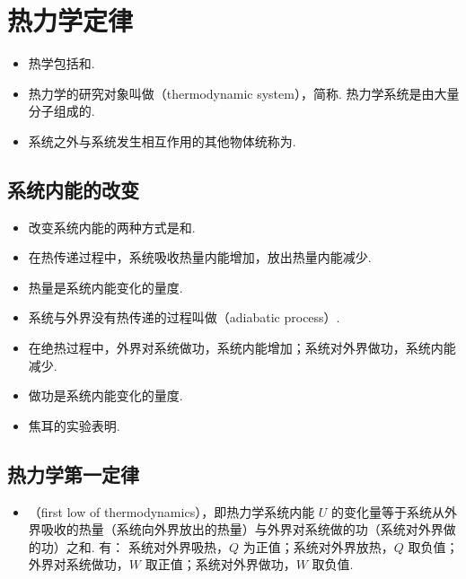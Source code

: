 \newpage
\section{热力学定律}

\vspace{10pt}
\begin{itemize}
\item 热学包括和.
\item 热力学的研究对象叫做（thermodynamic system），简称. 热力学系统是由大量分子组成的.
\item 系统之外与系统发生相互作用的其他物体统称为.
\end{itemize}

\subsection{系统内能的改变}
\vspace{10pt}
\begin{itemize}
\item 改变系统内能的两种方式是和.
\item 在热传递过程中，系统吸收热量内能增加，放出热量内能减少.
\item 热量是系统内能变化的量度.
\item 系统与外界没有热传递的过程叫做（adiabatic process）.
\item 在绝热过程中，外界对系统做功，系统内能增加；系统对外界做功，系统内能减少.
\item 做功是系统内能变化的量度.
\item 焦耳的实验表明.
\end{itemize}

\subsection{热力学第一定律}
\vspace{10pt}
\begin{itemize}
\item {}（first low of thermodynamics），即热力学系统内能 $U$ 的变化量等于系统从外界吸收的热量（系统向外界放出的热量）与外界对系统做的功（系统对外界做的功）之和. 有：
\newline 系统对外界吸热，$Q$ 为正值；系统对外界放热，$Q$ 取负值；外界对系统做功，$W$ 取正值；系统对外界做功，$W$ 取负值.
\end{itemize}

